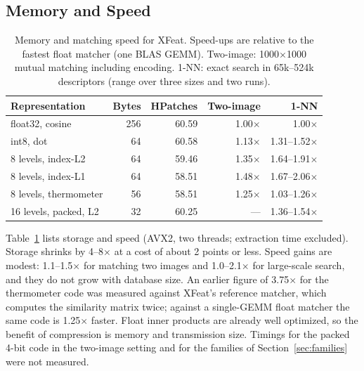 \documentclass[10pt,conference]{IEEEtran}
\begin{document}
\subsection{Memory and Speed}
\begin{table}[t]
\caption{Memory and matching speed for XFeat. Speed-ups are relative to the fastest float matcher (one BLAS GEMM). Two-image: 1000$\times$1000 mutual matching including encoding. 1-NN: exact search in 65k--524k descriptors (range over three sizes and two runs).}
\label{tab:speed}
\centering\footnotesize
\begin{tabular}{@{}lrrrr@{}}
\toprule
Representation & Bytes & HPatches & Two-image & 1-NN\\
\midrule
float32, cosine & 256 & 60.59 & 1.00$\times$ & 1.00$\times$\\
int8, dot & 64 & 60.58 & 1.13$\times$ & 1.31--1.52$\times$\\
8 levels, index-L2 & 64 & 59.46 & 1.35$\times$ & 1.64--1.91$\times$\\
8 levels, index-L1 & 64 & 58.51 & 1.48$\times$ & 1.67--2.06$\times$\\
8 levels, thermometer & 56 & 58.51 & 1.25$\times$ & 1.03--1.26$\times$\\
16 levels, packed, L2 & 32 & 60.25 & --- & 1.36--1.54$\times$\\
\bottomrule
\end{tabular}
\end{table}
Table~\ref{tab:speed} lists storage and speed (AVX2, two threads; extraction time excluded). Storage shrinks by 4--8$\times$ at a cost of about 2 points or less. Speed gains are modest: 1.1--1.5$\times$ for matching two images and 1.0--2.1$\times$ for large-scale search, and they do not grow with database size. An earlier figure of 3.75$\times$ for the thermometer code was measured against XFeat's reference matcher, which computes the similarity matrix twice; against a single-GEMM float matcher the same code is 1.25$\times$ faster. Float inner products are already well optimized, so the benefit of compression is memory and transmission size. Timings for the packed 4-bit code in the two-image setting and for the families of Section~\ref{sec:families} were not measured.
\end{document}
